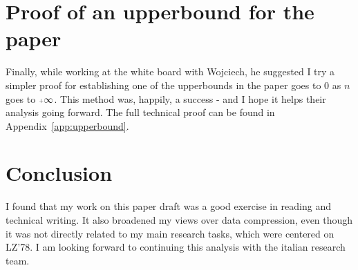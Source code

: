 \section{Proof of an upperbound for the paper}
\hypertarget{upperbound}{}

Finally, while working at the white board with Wojciech, he suggested 
I try a simpler proof for establishing one of the upperbounds in the 
paper goes to 0 as $n$ goes to $\pinf$. This method was, happily, 
a success - and I hope it helps their analysis going forward.
The full technical proof can be found in Appendix~\ref{app:upperbound}.

\section{Conclusion}

I found that my work on this paper draft was a good exercise in reading
and technical writing. It also broadened my views over data compression, 
even though it was not directly related to my main research tasks, which were
centered on LZ'78. I am looking forward to continuing this analysis 
with the italian research team.

\renewcommand{\subsection}{\oldsubsection}
\renewcommand{\section}{\oldsection}